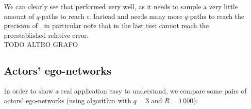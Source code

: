 	
	
	We can clearly see that \fcount performed very well, as it needs to sample a very little amount of $q$-paths to reach $\epsilon$.
	Instead \fsamp and \base needs many more $q$-paths to reach the precision of \fcount, in particular note that in the last test \base cannot reach the preestablished relative error.\\
	
	TODO ALTRO GRAFO
	
\clearpage
	

	

	\subsection*{Actors' ego-networks}
	
	In order to show a real application easy to understand, we compare
	some pairs of actors' ego-networks (using \fcount algorithm with $q=3$ and $R=1\,000$):
	
